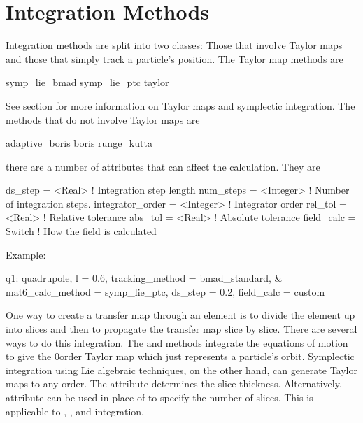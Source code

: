 \section{Integration Methods}
\label{s:integ}

Integration methods are split into two classes: Those that involve
Taylor maps and those that simply track a particle's position.  The
Taylor map methods are
\begin{example}
  symp_lie_bmad
  symp_lie_ptc
  taylor
\end{example}
See section  for more information on Taylor maps
and symplectic integration.  The methods that do not involve Taylor
maps are
\begin{example}
  adaptive_boris
  boris
  runge_kutta
\end{example}

there are a number of attributes that can affect the calculation. They are
\begin{example}
  ds_step = <Real>              ! Integration step length
  num_steps = <Integer>         ! Number of integration steps.
  integrator_order = <Integer>  ! Integrator order
  rel_tol = <Real>              ! Relative tolerance
  abs_tol = <Real>              ! Absolute tolerance
  field_calc = Switch           ! How the field is calculated
\end{example}

Example:
\begin{example}
  q1: quadrupole, l = 0.6, tracking_method = bmad_standard, &
        mat6_calc_method = symp_lie_ptc, ds_step = 0.2, field_calc = custom
\end{example}

One way to create a transfer map through an element is to divide the
element up into slices and then to propagate the transfer map slice by
slice.  There are several ways to do this integration. The 
and  methods integrate the equations of motion to
give the 0\Th order Taylor map which just represents a particle's
orbit.  Symplectic integration using Lie
algebraic techniques, on the other hand, can generate Taylor maps to
any order.  The  attribute determines the slice thickness.
Alternatively,  attribute can be used in place of
 to specify the number of slices.
This is applicable to , , and
 integration.

